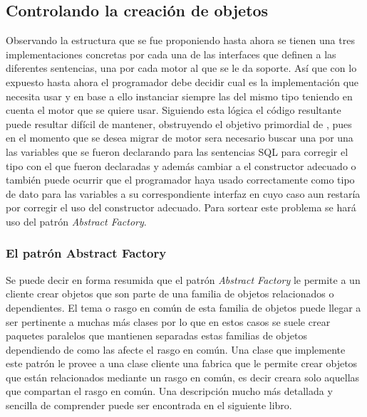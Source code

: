 \subsection{Controlando la creación de objetos}
Observando la estructura que se fue proponiendo hasta ahora se tienen una tres implementaciones concretas por cada una de las interfaces que definen a las diferentes sentencias, una por cada motor al que se le da soporte. Así que con lo expuesto hasta ahora el programador debe decidir cual es la implementación que necesita usar y en base a ello instanciar siempre las del mismo tipo teniendo en cuenta el motor que se quiere usar. Siguiendo esta lógica el código resultante puede resultar difícil de mantener, obstruyendo el objetivo primordial de \jj,  pues en el momento que se desea migrar de motor sera necesario buscar una por una las variables que se fueron declarando para las sentencias SQL para corregir el tipo con el que fueron declaradas y además cambiar a el constructor adecuado o también puede ocurrir que el programador haya usado correctamente como tipo de dato para las variables a su correspondiente interfaz en cuyo caso aun restaría por corregir el uso del constructor adecuado. Para sortear este problema se hará uso del patrón \textit{Abstract Factory}.
%
\subsubsection{El patrón Abstract Factory}
Se puede decir en forma resumida que el patrón \textit{Abstract Factory} le permite a un cliente crear objetos que son parte de una familia de objetos relacionados o dependientes. El tema o rasgo en común de esta familia de objetos puede llegar a ser pertinente a muchas más clases por lo que en estos casos se suele crear paquetes paralelos que mantienen separadas estas familias de objetos dependiendo de como las afecte el rasgo en común. Una clase que implemente este patrón le provee a una clase cliente una fabrica que le permite crear objetos que están relacionados mediante un rasgo en común, es decir creara solo aquellas que compartan el rasgo en común. Una descripción mucho más detallada y sencilla de comprender puede ser encontrada en el siguiente libro\cite{Metsker:2002:DPJ}. 

